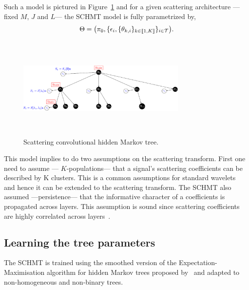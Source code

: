 \documentclass{article}
\begin{document}
    Such a model is pictured in Figure~\ref{fig:SCHMT 1} and for a given scattering architecture ---\ie fixed $M$, $J$ and $L$--- the SCHMT model is fully parametrized by,
    \vspace{-5pt}
    \begin{equation}
      \Theta = \big(\pi_{0}, \{ \epsilon_{i}, \{ \theta_{k,i} \}_{k\in\llbracket1,K\rrbracket} \}_{i\in\mathcal{T}}\big).
      \label{eq:SCHMT - parameters}
    \end{equation}
    \vspace{-15pt}

    \begin{figure}
      \begin{center}
        \includegraphics[width=3.3in, height=2in, keepaspectratio]{scat_HMT_crop.pdf}
        \caption{Scattering convolutional hidden Markov tree.}
        \label{fig:SCHMT 1}
      \end{center}
    \end{figure}

    This model implies to do two assumptions on the scattering transform. First one need to assume --- $K$-populations--- that a signal’s scattering coefficients can be described by K clusters. This is a common assumptions for standard wavelets~\citep{kingsbury2001complex} and hence it can be extended to the scattering transform. The SCHMT also assumed ---persistence--- that the informative character of a coefficients is propagated across layers. This assumption is sound since scattering coefficients are highly correlated across layers~\citep{Oyallon}.
    
  \subsection{Learning the tree parameters}
    \label{subsec:SCHMT/Learning}    

    The SCHMT is trained using the smoothed version of the Expectation-Maximisation algorithm \citep{someone} for hidden Markov trees proposed by~\citep{Durand} and adapted to non-homogeneous and non-binary trees.
    
\end{document}
